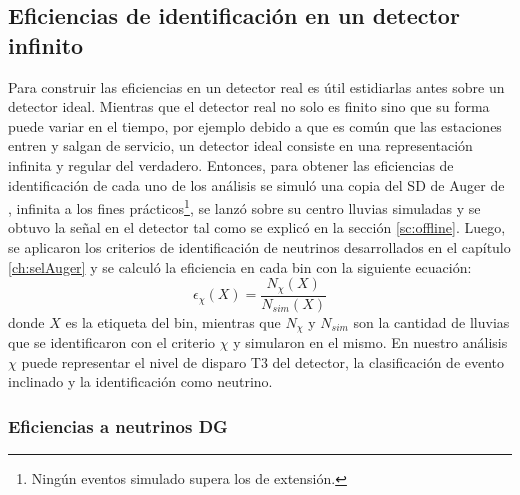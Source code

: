 	\subsection{Eficiencias de identificación en un detector infinito}
	\label{sbsc:idealEff}
	
	Para construir las eficiencias en un detector real es útil estidiarlas antes sobre un detector ideal.
	Mientras que el detector real no solo es finito sino que su forma puede variar en el tiempo, por ejemplo debido a que es común que las estaciones entren y salgan de servicio, un detector ideal consiste en una representación infinita y regular del verdadero.
	Entonces, para obtener las eficiencias de identificación de cada uno de los análisis se simuló una copia del SD de Auger de , infinita a los fines prácticos\footnote{Ningún eventos simulado supera los  de extensión.}, se lanzó sobre su centro lluvias simuladas y se obtuvo la señal en el detector tal como se explicó en la sección \ref{sc:offline}.
	Luego, se aplicaron los criterios de identificación de neutrinos desarrollados en el capítulo \ref{ch:selAuger} y se calculó la eficiencia en cada bin con la siguiente ecuación:
	\begin{equation}
	 \epsilon_\chi(X)=\frac{N_{\chi}(X)}{N_{sim}(X)}
	 \label{eq:effDef}
	\end{equation}
	donde $X$ es la etiqueta del bin, mientras que $N_{\chi}$ y $N_{sim}$ son la cantidad de lluvias que se identificaron con el criterio $\chi$ y simularon en el mismo. En nuestro análisis $\chi$ puede representar el nivel de disparo T3 del detector, la clasificación de  evento inclinado y la identificación como neutrino.
	
	\subsubsection{Eficiencias a neutrinos DG}
	
